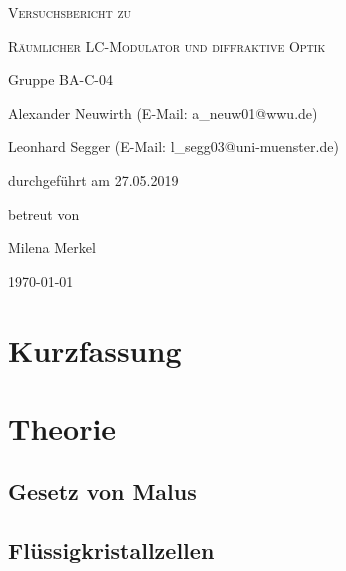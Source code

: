 \documentclass[
	a4paper,
	12pt,
	pagesize,
	ngerman
]{scrartcl}
\begin{document}
	\begin{titlepage}
		\centering
		{\scshape\LARGE Versuchsbericht zu \par}
		\vspace{1cm}
		{\scshape\huge Räumlicher LC-Modulator und diffraktive Optik \par}
		\vspace{2.5cm}
		{\LARGE Gruppe BA-C-04 \par}
		\vspace{0.5cm}

		{\large Alexander Neuwirth (E-Mail: a\_neuw01@wwu.de) \par}
		{\large Leonhard Segger (E-Mail: l\_segg03@uni-muenster.de) \par}
		\vfill

		durchgeführt am 27.05.2019\par
		betreut von\par
		{\large Milena Merkel}

		\vfill

		{\large \today\par}
	\end{titlepage}
	\tableofcontents
	\newpage

	\section{Kurzfassung}

  \section{Theorie}

	\subsection{Gesetz von Malus}

	\subsection{Flüssigkristallzellen}
\end{document}
